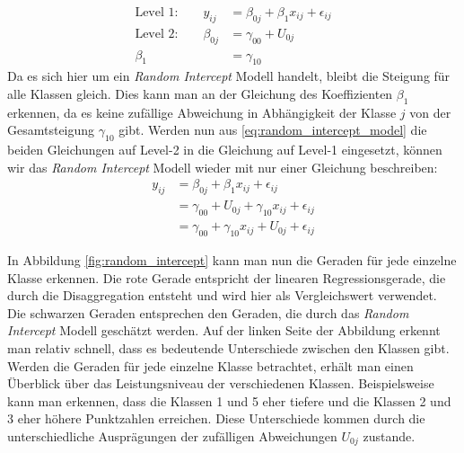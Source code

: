 \documentclass[12pt]{article}\usepackage[]{graphicx}\usepackage[]{color}
\begin{document}
\begin{equation} \label{eq:random_intercept_model}
\begin{split}	
 \text{Level 1:}  	\qquad 	y_{ij} 		& = \beta_{0j} + \beta_{1}x_{ij} + \epsilon_{ij}\\
 \text{Level 2:} 	\qquad 	\beta_{0j} 	& = \gamma_{00} + U_{0j}\\
 							\beta_{1} 	& = \gamma_{10}
\end{split}	
\end{equation} 
Da es sich hier um ein \textit{Random Intercept} Modell handelt, bleibt die Steigung für alle Klassen gleich. Dies kann man an der Gleichung des Koeffizienten $\beta_{1}$ erkennen, da es keine zufällige Abweichung in Abhängigkeit der Klasse $j$ von der Gesamtsteigung $\gamma_{10}$ gibt. Werden nun aus \eqref{eq:random_intercept_model} die beiden Gleichungen auf Level-2 in die Gleichung auf Level-1 eingesetzt, können wir das \textit{Random Intercept} Modell wieder mit nur einer Gleichung beschreiben:
\begin{equation}
\begin{split}
y_{ij} 	& = \beta_{0j} + \beta_{1}x_{ij} + \epsilon_{ij} \\
		& = \gamma_{00} + U_{0j} + \gamma_{10}x_{ij} + \epsilon_{ij} \\
		& = \gamma_{00} + \gamma_{10}x_{ij} + U_{0j} + \epsilon_{ij}
\end{split}
\end{equation}

In Abbildung \ref{fig:random_intercept} kann man nun die Geraden für jede einzelne Klasse erkennen. Die rote Gerade entspricht der linearen Regressionsgerade, die durch die Disaggregation entsteht und wird hier als Vergleichswert verwendet. Die schwarzen Geraden entsprechen den Geraden, die durch das \textit{Random Intercept} Modell geschätzt werden. Auf der linken Seite der Abbildung erkennt man relativ schnell, dass es bedeutende Unterschiede zwischen den Klassen gibt. Werden die Geraden für jede einzelne Klasse betrachtet, erhält man einen Überblick über das Leistungsniveau der verschiedenen Klassen. Beispielsweise kann man erkennen, dass die Klassen 1 und 5 eher tiefere und die Klassen 2 und 3 eher höhere Punktzahlen erreichen. Diese Unterschiede kommen durch die unterschiedliche Ausprägungen der zufälligen Abweichungen $U_{0j}$ zustande. 
\end{document}
